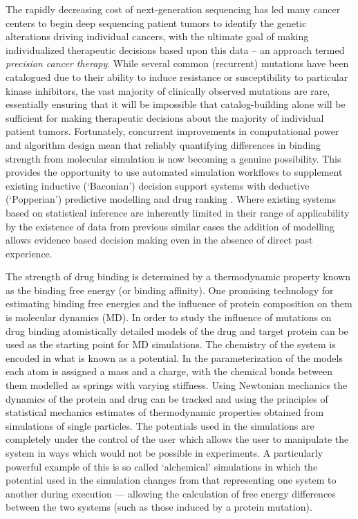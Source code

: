 The rapidly decreasing cost of next-generation sequencing has led many cancer centers to begin deep sequencing patient tumors to identify the genetic alterations driving individual cancers, with the ultimate goal of making individualized therapeutic decisions based upon this data -- an approach termed \textit{precision cancer therapy}.
While several common (recurrent) mutations have been catalogued due to their ability to induce resistance or susceptibility to particular kinase inhibitors, the vast majority of clinically observed mutations are rare, essentially ensuring that it will be impossible that catalog-building alone will be sufficient for making therapeutic decisions about the majority of individual patient tumors.
Fortunately, concurrent improvements in computational power and algorithm design mean that reliably quantifying differences in binding strength from molecular simulation is now becoming a genuine possibility.
This provides the opportunity to use automated simulation workflows to supplement existing inductive (`Baconian') decision support systems with deductive (`Popperian') predictive modelling and drug ranking \cite{Marias2011, Sloot2009}.
Where existing systems based on statistical inference are inherently limited in their range of applicability by the existence of data from previous similar cases the addition of modelling allows evidence based decision making even in the absence of direct past experience.

The strength of drug binding is determined by a thermodynamic property known as the binding free energy (or binding affinity). 
One promising technology for estimating binding free energies and the influence of protein composition on them is molecular dynamics (MD).
In order to study the influence of mutations on drug binding atomistically detailed models of the drug and target protein can be used as the starting point for MD simulations.
The chemistry of the system is encoded in what is known as a potential. \cite{Karplus2002}
In the parameterization of the models each atom is assigned a mass and a charge, with the chemical bonds between them modelled as springs with varying stiffness.
Using Newtonian mechanics the dynamics of the protein and drug can be tracked and using the principles of statistical mechanics estimates of thermodynamic properties obtained from simulations of single particles.
The potentials used in the simulations are completely under the control of the user which allows the user to manipulate the system in ways which would not be possible in experiments.
A particularly powerful example of this is so called `alchemical' simulations in which the potential used in the simulation changes from that representing one system to another during execution — allowing the calculation of free energy differences between the two systems (such as those induced by a protein mutation).

